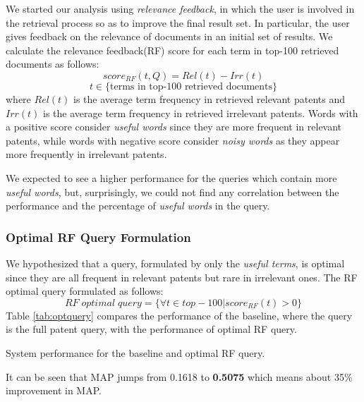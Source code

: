 \documentclass{sig-alternate}
\begin{document}
We started our analysis using {\em relevance feedback}, in which the user is involved in the retrieval process so as to improve the final result set. In particular, the user gives feedback on the relevance of documents in an initial set of results. We calculate the relevance feedback(RF) score for each term in top-100 retrieved documents as follows:
\begin{equation}
score_{RF}(t,Q)=Rel(t)-Irr(t) 
 \label{eq:score}
\end{equation}\vspace*{-6ex}
\begin{displaymath}t\in \lbrace \mbox{terms in top-100 retrieved documents}\rbrace\end{displaymath}
where $ Rel(t) $ is the average term frequency in retrieved relevant patents and $ Irr(t) $ is the average term frequency in retrieved irrelevant patents. Words with a positive score consider {\em useful words} since they are more frequent in relevant patents, while words with negative score consider {\em noisy words} as they appear more frequently in irrelevant patents. 

We expected to see a higher performance for the queries which contain more {\em useful words}, but, surprisingly, we could not find any correlation between the performance and the percentage of {\em useful words} in the query. 

\subsubsection{Optimal RF Query Formulation}
We hypothesized that a query, formulated by only the {\em useful terms}, is optimal since they are all frequent in relevant patents but rare in irrelevant ones. The RF optimal query formulated as follows: 
\begin{equation}
RF\; optimal\; query = \{\forall t \in top-100|score_{RF}(t)>0\}   
 \label{eq:score}
\end{equation}
Table \ref{tab:optquery} compares the performance of the baseline, where the query is the full patent query, with the performance of optimal RF query. 
\begin{table}[htpb]
  \begin{center}
   \caption{System performance for the baseline and optimal RF query.}
     
  \label{tab:optquery}
  \end{center}  
\end{table}
It can be seen that MAP jumps from 0.1618 to \textbf{0.5075} which means about 35\% improvement in MAP.
\end{document}
